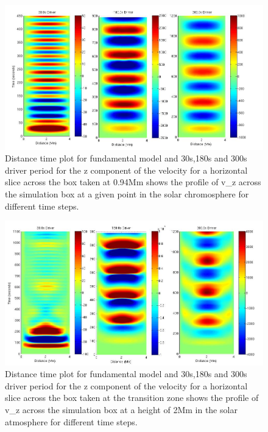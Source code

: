 \documentclass{aa}
\begin{document}
\begin{figure}[h]\label{fig5_dt_30_180_300_0_horiz_p94Mm}
\includegraphics[scale=0.5]{images/fig5_dt_30_180_300_0_horiz_p94Mm.jpg}
\caption{Distance time plot for fundamental model and 30s,180s and 300s driver period for the z component of the velocity for a horizontal slice across the box  taken at 0.94Mm shows  the profile of v_{z} across the simulation box at a given point in the solar chromosphere for different time steps. }
\end{figure}


\begin{figure}[h]\label{fig6_dt_30_180_300_0_horiz_2Mm}
\includegraphics[scale=0.5]{images/fig6_dt_30_180_300_0_horiz_2Mm.jpg}
\caption{Distance time plot for fundamental model and 30s,180s and 300s driver period for the z component of the velocity for a horizontal slice across the box  taken at the transition zone shows  the profile of v_{z} across the simulation box at a height of 2Mm in the solar atmosphere for different time steps. }
\end{figure}
\end{document}
